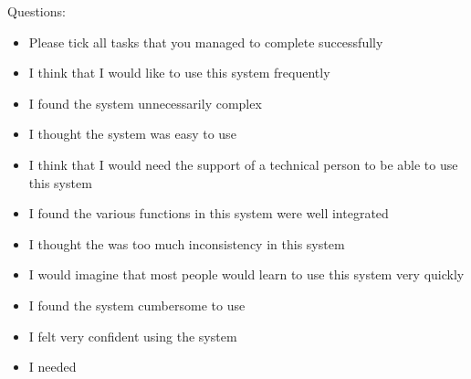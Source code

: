 \documentclass[12pt,a4paper,x11names]{article}
\begin{document}
\noindent{}Questions:
\begin{itemize}
\item Please tick all tasks that you managed to complete successfully
\item I think that I would like to use this system frequently
\item I found the system unnecessarily complex
\item I thought the system was easy to use
\item I think that I would need the support of a technical person to be able to use this system
\item I found the various functions in this system were well integrated
\item I thought the was too much inconsistency in this system
\item I would imagine that most people would learn to use this system very quickly
\item I found the system cumbersome to use
\item I felt very confident using the system
\item I needed
\end{itemize}
\end{document}
